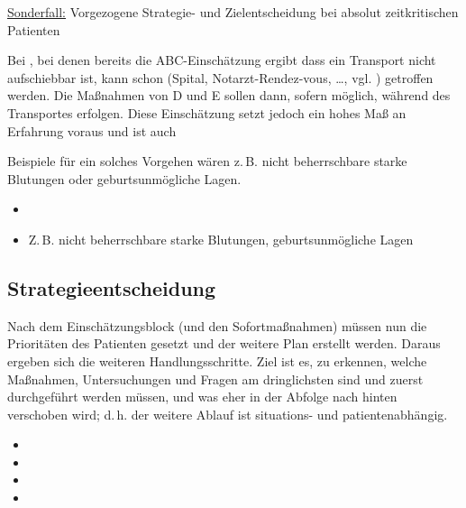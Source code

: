{\underline{Sonderfall:} Vorgezogene Strategie- und 
Zielentscheidung bei absolut zeitkritischen Patienten}
{%
\label{topic:sonderfall-absolut-zeitkritische-patienten}
Bei , bei denen bereits
die ABC-Einschätzung ergibt dass ein Transport nicht
aufschiebbar ist, kann schon  (Spital,
Notarzt-Rendez-vous, \ldots, vgl.
) getroffen werden.
Die Maßnahmen von D und E sollen dann, sofern möglich,
während des Transportes erfolgen.
Diese Einschätzung setzt jedoch ein hohes Maß an Erfahrung
voraus und ist auch


Beispiele für ein solches Vorgehen wären z.\,B. nicht
beherrschbare starke Blutungen oder geburtsunmögliche Lagen.
}
{
\begin{itemize}
  \item {}
  \item Z.\,B. nicht beherrschbare starke 
  Blutungen, geburtsunmögliche Lagen
\end{itemize}
}
{}
{}
{}





\subsection{Strategieentscheidung}

\label{topic:pam-strategie}

Nach dem Einschätzungsblock (und den Sofortmaßnahmen) müssen
nun die Prioritäten des Patienten gesetzt und der weitere
Plan erstellt werden. Daraus ergeben sich die weiteren
Handlungsschritte. Ziel ist es, zu erkennen, welche
Maßnahmen, Untersuchungen und Fragen am dringlichsten sind
und zuerst durchgeführt werden müssen, und was eher in der
Abfolge nach hinten ver\-schoben wird; d.\,h. der weitere
Ablauf ist situations- und patientenabhängig.

\begin{itemize}
  \item {}
  \item {}
  \item {}
  \item {}
\end{itemize}


